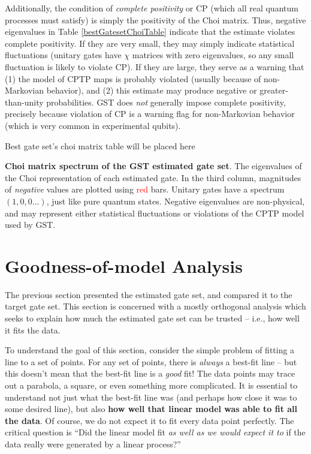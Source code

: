 \documentclass{article}[11pt]
\newcommand{\putfield}[2]{#2}
\begin{document}
Additionally, the condition of \emph{complete positivity} or CP (which all real quantum processes must satisfy) is simply the positivity of the Choi matrix.  Thus, negative eigenvalues in Table \ref{bestGatesetChoiTable} indicate that the estimate violates complete positivity.  If they are very small, they may simply indicate statistical fluctuations (unitary gates have $\chi$ matrices with zero eigenvalues, so any small fluctuation is likely to violate CP).  If they are large, they serve as a warning that (1) the model of CPTP maps is probably violated (usually because of non-Markovian behavior), and (2) this estimate may produce negative or greater-than-unity probabilities.  GST does \emph{not} generally impose complete positivity, precisely because violation of CP is a warning flag for non-Markovian behavior (which is very common in experimental qubits).

\begin{table}[h]
\begin{center}
\putfield{bestGatesetChoiEvalTable}{Best gate set's choi matrix table will be placed here}
\caption{\putfield{tt_bestGatesetChoiEvalTable}{}\textbf{Choi matrix spectrum of the GST estimated gate set}.  The eigenvalues of the Choi representation of each estimated gate.  In the third column, magnitudes of \emph{negative} values are plotted using \textcolor{red}{red} bars. Unitary gates have a spectrum $(1,0,0\ldots)$, just like pure quantum states.  Negative eigenvalues are non-physical, and may represent either statistical fluctuations or violations of the CPTP model used by GST.\label{bestGatesetChoiTable}}
\end{center}
\end{table}



\section{Goodness-of-model Analysis\label{secGoodness}}

The previous section presented the estimated gate set, and compared it to the target gate set.  This section is concerned with a mostly orthogonal analysis which seeks to explain how much the estimated gate set can be trusted -- i.e., how well it fits the data.

To understand the goal of this section, consider the simple problem of fitting a line to a set of points.  For any set of points, there is \emph{always} a best-fit line -- but this doesn't mean that the best-fit line is a \emph{good} fit!  The data points may trace out a parabola, a square, or even something more complicated.  It is essential to understand not just what the best-fit line was (and perhaps how close it was to some desired line), but also \textbf{how well that linear model was able to fit all the data}.  Of course, we do not expect it to fit every data point perfectly.  The critical question is ``Did the linear model fit \emph{as well as we would expect it to} if the data really were generated by a linear process?''
\end{document}
